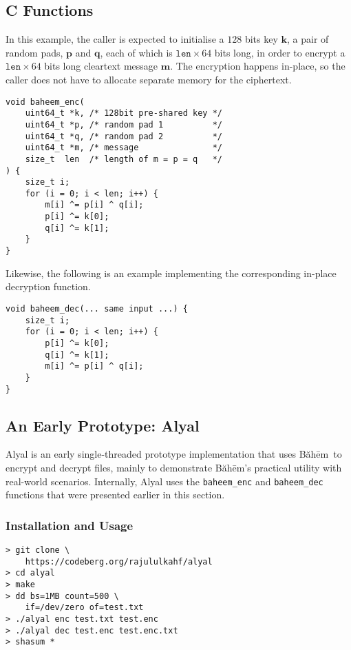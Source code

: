 \documentclass[twocolumn]{article}
\newcommand{\baheem}{Băhēm}
\begin{document}
\subsection{C Functions}
In this example, the caller is expected to initialise a $128$ bits key
$\mathbf{k}$, a pair of random pads, $\mathbf{p}$ and $\mathbf{q}$, each of
which is $\mathtt{len} \times 64$ bits long, in order to encrypt a
$\mathtt{len} \times 64$ bits long cleartext message $\mathbf{m}$.  The
encryption happens in-place, so the caller does not have to allocate
separate memory for the ciphertext.

\begin{verbatim}
void baheem_enc(
    uint64_t *k, /* 128bit pre-shared key */
    uint64_t *p, /* random pad 1          */
    uint64_t *q, /* random pad 2          */
    uint64_t *m, /* message               */
    size_t  len  /* length of m = p = q   */
) {
    size_t i;
    for (i = 0; i < len; i++) {
        m[i] ^= p[i] ^ q[i];
        p[i] ^= k[0];
        q[i] ^= k[1];
    }
}
\end{verbatim}

Likewise, the following is an example implementing the corresponding
in-place decryption function.

\begin{verbatim}
void baheem_dec(... same input ...) {
    size_t i;
    for (i = 0; i < len; i++) {
        p[i] ^= k[0];
        q[i] ^= k[1];
        m[i] ^= p[i] ^ q[i];
    }
}
\end{verbatim}

\subsection{An Early Prototype:  Alyal}
Alyal is an early single-threaded prototype implementation that uses
\baheem\ to encrypt and decrypt files, mainly to demonstrate \baheem's
practical utility with real-world scenarios.  Internally, Alyal uses the
\texttt{baheem\_enc} and \texttt{baheem\_dec} functions that were presented
earlier in this section.

\subsubsection{Installation and Usage}
\begin{verbatim}
> git clone \
    https://codeberg.org/rajululkahf/alyal
> cd alyal
> make
> dd bs=1MB count=500 \
    if=/dev/zero of=test.txt
> ./alyal enc test.txt test.enc
> ./alyal dec test.enc test.enc.txt
> shasum *
\end{verbatim}
\end{document}
